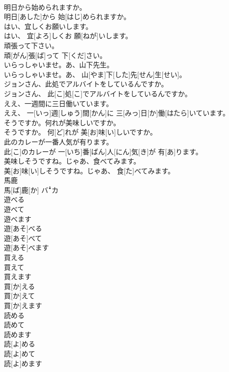 \documentclass[8pt]{extreport}
\begin{document}
\begin{CJK}{UTF8}{min}
\\	明日から始められますか。	
\\	明日[あした]から 始[はじ]められますか。
\\	はい、宜しくお願いします。	
\\	はい、 宜[よろ]しくお 願[ねが]いします。
\\	頑張って下さい。	
\\	頑[がん]張[ば]って 下[くだ]さい。
\\	いらっしゃいませ。あ、山下先生。	
\\	いらっしゃいませ。あ、 山[やま]下[した]先[せん]生[せい]。
\\	ジョンさん、此処でアルバイトをしているんですか。	
\\	ジョンさん、 此[こ]処[こ]でアルバイトをしているんですか。
\\	ええ、一週間に三日働いています。	
\\	ええ、 一[いっ]週[しゅう]間[かん]に 三[みっ]日[か]働[はたら]いています。
\\	そうですか。何れが美味しいですか。	
\\	そうですか。 何[ど]れが 美[お]味[い]しいですか。
\\	此のカレーが一番人気が有ります。	
\\	此[こ]のカレーが 一[いち]番[ばん]人[にん]気[き]が 有[あ]ります。
\\	美味しそうですね。じゃあ、食べてみます。	
\\	美[お]味[い]しそうですね。じゃあ、 食[た]べてみます。
\\	馬鹿	
\\	馬[ば]鹿[か]	バꜜカ
\\	遊べる 
\\	遊べて 
\\	遊べます	
\\	遊[あそ]べる 
\\	遊[あそ]べて 
\\	遊[あそ]べます
\\	買える 
\\	買えて 
\\	買えます	
\\	買[か]える 
\\	買[か]えて 
\\	買[か]えます
\\	読める 
\\	読めて 
\\	読めます	
\\	読[よ]める 
\\	読[よ]めて 
\\	読[よ]めます

\end{CJK}
\end{document}
